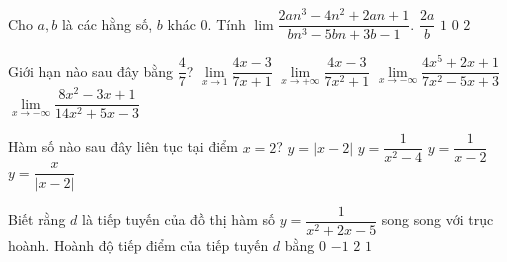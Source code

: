 \begin{ex}%
	Cho $a,b$ là các hằng số, $b$ khác $0$. Tính $\lim\limits\dfrac{2an^3-4n^2+2an+1}{bn^3-5bn+3b-1}$.
	\choice
	{\True $\dfrac{2a}{b}$}
	{$1$}
	{$0$}
	{$2$}
\end{ex}

\begin{ex}%
	Giới hạn nào sau đây bằng $\dfrac{4}{7}$?
	\choice
	{$\lim\limits_{x\to 1}\dfrac{4x-3}{7x+1}$}
	{$\lim\limits_{x\to +\infty}\dfrac{4x-3}{7x^2+1}$}
	{$\lim\limits_{x\to -\infty}\dfrac{4x^5+2x+1}{7x^2-5x+3}$}
	{\True $\lim\limits_{x\to -\infty}\dfrac{8x^2-3x+1}{14x^2+5x-3}$}
\end{ex}

\begin{ex}%
	Hàm số nào sau đây liên tục tại điểm $x=2$?
	\choice
	{\True $y=\left|x-2\right|$}
	{$y=\dfrac{1}{x^2-4}$}
	{$y=\dfrac{1}{x-2}$}
	{$y=\dfrac{x}{\left|x-2\right|}$}
\end{ex}

\begin{ex}%
	Biết rằng $d$ là tiếp tuyến của đồ thị hàm số $y=\dfrac{1}{x^2+2x-5}$ song song với trục hoành. Hoành độ tiếp điểm của tiếp tuyến $d$ bằng
	\choice
	{$0$}
	{\True $-1$}
	{$2$}
	{$1$}
\end{ex}

